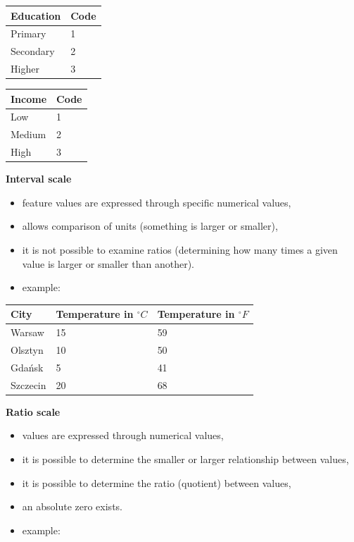 \documentclass[
  english,
  letterpaper,
  DIV=11,
  numbers=noendperiod]{scrreprt}
\newcounter{none} %
\providecommand{\tightlist}{%
  \setlength{\itemsep}{0pt}\setlength{\parskip}{0pt}}
\begin{document}
{\def\LTcaptype{none} %
\begin{longtable}[]{@{}ll@{}}
\toprule\noalign{}
Education & Code \\
\midrule\noalign{}
\endhead
\bottomrule\noalign{}
\endlastfoot
Primary & 1 \\
Secondary & 2 \\
Higher & 3 \\
\end{longtable}
}

{\def\LTcaptype{none} %
\begin{longtable}[]{@{}ll@{}}
\toprule\noalign{}
Income & Code \\
\midrule\noalign{}
\endhead
\bottomrule\noalign{}
\endlastfoot
Low & 1 \\
Medium & 2 \\
High & 3 \\
\end{longtable}
}

\textbf{Interval scale}

\begin{itemize}
\tightlist
\item
  feature values are expressed through specific numerical values,
\item
  allows comparison of units (something is larger or smaller),
\item
  it is not possible to examine ratios (determining how many times a
  given value is larger or smaller than another).
\item
  example:
\end{itemize}

{\def\LTcaptype{none} %
\begin{longtable}[]{@{}lll@{}}
\toprule\noalign{}
City & Temperature in \(^{\circ}C\) & Temperature in \(^{\circ}F\) \\
\midrule\noalign{}
\endhead
\bottomrule\noalign{}
\endlastfoot
Warsaw & 15 & 59 \\
Olsztyn & 10 & 50 \\
Gdańsk & 5 & 41 \\
Szczecin & 20 & 68 \\
\end{longtable}
}

\textbf{Ratio scale}

\begin{itemize}
\tightlist
\item
  values are expressed through numerical values,
\item
  it is possible to determine the smaller or larger relationship between
  values,
\item
  it is possible to determine the ratio (quotient) between values,
\item
  an absolute zero exists.
\item
  example:
\end{itemize}
\end{document}
